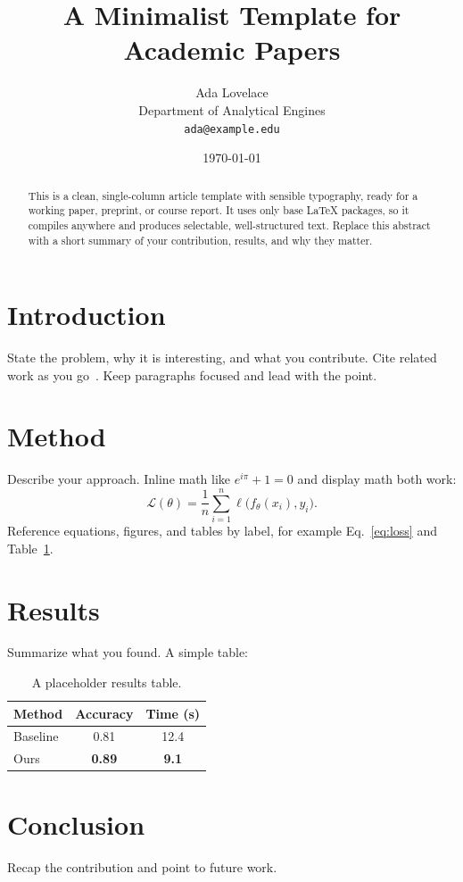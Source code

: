 \documentclass[11pt]{article}
\title{A Minimalist Template for Academic Papers}
\author{Ada Lovelace \\ \small Department of Analytical Engines \\ \small \texttt{ada@example.edu}}
\date{\today}
\begin{document}
\maketitle

\begin{abstract}
This is a clean, single-column article template with sensible typography, ready
for a working paper, preprint, or course report. It uses only base LaTeX packages,
so it compiles anywhere and produces selectable, well-structured text. Replace this
abstract with a short summary of your contribution, results, and why they matter.
\end{abstract}

\section{Introduction}
State the problem, why it is interesting, and what you contribute. Cite related
work as you go~\cite{knuth1984}. Keep paragraphs focused and lead with the point.

\section{Method}
Describe your approach. Inline math like $e^{i\pi} + 1 = 0$ and display math both
work:
\begin{equation}
  \mathcal{L}(\theta) = \frac{1}{n}\sum_{i=1}^{n} \ell\big(f_\theta(x_i), y_i\big).
  \label{eq:loss}
\end{equation}
Reference equations, figures, and tables by label, for example Eq.~\eqref{eq:loss}
and Table~\ref{tab:results}.

\section{Results}
Summarize what you found. A simple table:

\begin{table}[t]
  \centering
  \caption{A placeholder results table.}
  \label{tab:results}
  \begin{tabular}{@{}lcc@{}}
    \toprule
    Method & Accuracy & Time (s) \\
    \midrule
    Baseline & 0.81 & 12.4 \\
    Ours     & \textbf{0.89} & \textbf{9.1} \\
    \bottomrule
  \end{tabular}
\end{table}

\section{Conclusion}
Recap the contribution and point to future work.



\end{document}
